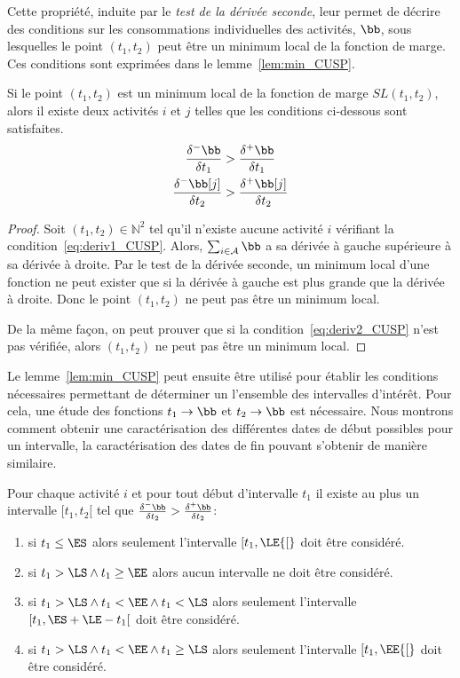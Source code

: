 Cette propriété, induite par le {\it test de la dérivée seconde}, leur
permet de décrire des conditions sur les consommations individuelles
des activités, $\bb$, sous lesquelles le point $(t_1,t_2)$ peut être
un minimum local de la fonction de marge. Ces conditions sont
exprimées dans le lemme~\ref{lem:min_CUSP}.

\begin{lemma}
\label{lem:min_CUSP}
Si le point $(t_1,t_2)$ est un minimum local de la fonction de marge
$SL(t_1,t_2)$, alors il existe deux activités $i$ et $j$ telles que les
conditions ci-dessous sont satisfaites. 
\begin{align} \frac{\delta^{-}\bb}{\delta t_1} &>
\frac{\delta^{+}\bb}{\delta t_1} \label{eq:deriv1_CUSP}\\ 
\frac{\delta^{-}\bb[j]}{\delta t_2}
& > \frac{\delta^{+}\bb[j]}{\delta t_2} \label{eq:deriv2_CUSP}
\end{align}
\end{lemma}

\begin{proof}
Soit $(t_1,t_2) \in \mathbb{N}^2$ tel qu'il n'existe aucune activité
$i$ vérifiant la condition~\eqref{eq:deriv1_CUSP}. Alors, $\sum_{i \in
  \A} \bb$ a sa dérivée à gauche supérieure à sa dérivée à droite. Par
le test de la dérivée seconde, un minimum local d'une fonction ne peut
exister que si la dérivée à gauche est plus grande que la dérivée à
droite. Donc le point $(t_1,t_2)$ ne peut pas être un minimum local. 

De la même façon, on peut prouver que si la
condition~\eqref{eq:deriv2_CUSP} n'est pas vérifiée, alors $(t_1,t_2)$
ne peut pas être un minimum local. 
\end{proof}

Le lemme~\ref{lem:min_CUSP} peut ensuite être utilisé pour établir 
les conditions nécessaires permettant de déterminer un l'ensemble des
intervalles d'intérêt. Pour cela, une étude des fonctions $t_1
\rightarrow \bb$ et $t_2 \rightarrow \bb$ est nécessaire. Nous montrons
comment obtenir une caractérisation des différentes dates de début
possibles pour un intervalle, la caractérisation des dates de fin
pouvant s'obtenir de manière similaire.

\begin{lemma}
  Pour chaque activité $i$ et pour tout début d'intervalle $t_1$ il
  existe au plus un intervalle $[t_1,t_2[$ tel que
  $\frac{\delta^{-}\bb}{\delta t_2} >
  \frac{\delta^{+}\bb}{\delta t_2} $:
  \begin{enumerate}
  \item si $t_1 \le \ES$ alors seulement l'intervalle $[t_1,\LE {[}$ doit
    être considéré.
  \item si $t_1  > \LS \land t_1 \ge \EE$ alors aucun intervalle ne
    doit être considéré. 
  \item si $t_1  > \LS \land t_1 <\EE \land t_1 < \LS$ alors seulement
    l'intervalle $[t_1,\ES+\LE-t_1 [$ doit
    être considéré.
  \item si $t_1  > \LS \land t_1 <\EE \land t_1 \ge \LS$ alors
    seulement l'intervalle $[t_1,\EE {[}$ doit
    être considéré.
  \end{enumerate}
\end{lemma}

